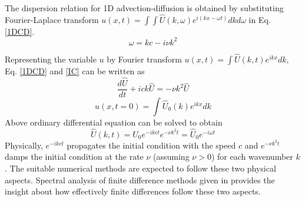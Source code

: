 \documentclass[fleqn]{article}
\begin{document}
The dispersion relation for 1D advection-diffusion is obtained by substituting Fourier-Laplace transform $u(x, t) = \int \int \hat{U}(k, \omega) e^{i(kx -\omega t)} dk d\omega$ in Eq. \ref{1DCD}. 
\begin{equation}
\omega = k c - i \nu k^2
\label{pdrp}
\end{equation}

Representing the variable $u$ by Fourier transform $u(x, t) = \int \hat{U}(k,t) e^{ikx} dk$, Eq. \ref{1DCD} and \ref{IC} can be written as
\begin{equation*}
\frac{d \hat{U}}{dt} + ick\hat{U} = - \nu k^2 \hat{U}
\end{equation*}
\begin{equation*}
u(x, t=0) = \int \hat{U}_0(k) e^{ikx} dk
\end{equation*}
Above ordinary differential equation can be solved to obtain
\begin{equation*}
\hat{U}(k,t) = \hat{U}_0 e^{-ikct} e^{-\nu k^2 t} = \hat{U}_0 e^{-i \omega t} 
\end{equation*}
Physically, $e^{-ikct}$ propagates the initial condition with the speed $c$ and $e^{-\nu k^2 t}$ damps the initial condition at the rate $\nu$ (assuming $\nu > 0$) for each wavenumber $k$. The suitable numerical methods are expected to follow these two physical aspects. Spectral analysis of finite difference methods given in \cite{TKS_book, CH_book} provides the insight about how effectively finite differences follow these two aspects.
\end{document}
